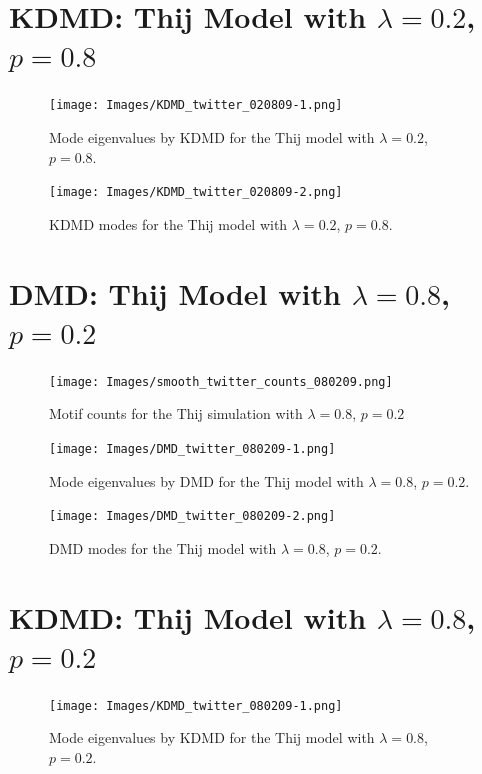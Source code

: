 \clearpage
\section{KDMD: Thij Model with $\lambda=0.2$, $p=0.8$}


\begin{figure}
    \texttt{[image: Images/KDMD\_twitter\_020809-1.png]}
    \centering
    \caption{Mode eigenvalues by KDMD for the Thij model
    with $\lambda=0.2$, $p=0.8$.}
    \label{fig:kdmd02083}
\end{figure}

\begin{figure}
    \texttt{[image: Images/KDMD\_twitter\_020809-2.png]}
    \centering
    \caption{ KDMD modes for the Thij model
    with $\lambda=0.2$, $p=0.8$.}
    \label{fig:kdmd02084}
\end{figure}

\FloatBarrier

\clearpage

\section{DMD: Thij Model with $\lambda=0.8$, $p=0.2$}
\begin{figure}
    \texttt{[image: Images/smooth\_twitter\_counts\_080209.png]}
    \centering
    \caption{Motif counts for the Thij simulation with $\lambda=0.8$, $p=0.2$}
    \label{fig:pthij0802}
\end{figure}

\clearpage
\begin{figure}
    \texttt{[image: Images/DMD\_twitter\_080209-1.png]}
    \centering
    \caption{Mode eigenvalues by DMD for the Thij model
    with $\lambda=0.8$, $p=0.2$.}
\end{figure}

\begin{figure}
    \texttt{[image: Images/DMD\_twitter\_080209-2.png]}
    \centering
    \caption{DMD modes for the Thij model
    with $\lambda=0.8$, $p=0.2$.}
\end{figure}


\clearpage
\section{KDMD: Thij Model with $\lambda=0.8$, $p=0.2$}


\begin{figure}
    \texttt{[image: Images/KDMD\_twitter\_080209-1.png]}
    \centering
    \caption{Mode eigenvalues by KDMD for the Thij model
    with $\lambda=0.8$, $p=0.2$.}
\end{figure}

